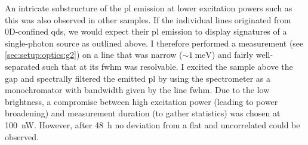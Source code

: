 An intricate substructure of the \gls{pl} emission at lower excitation powers such as this was also observed in other samples.
If the individual lines originated from 0D-confined \glspl{qd}, we would expect their \gls{pl} emission to display signatures of a single-photon source as outlined above. %
I therefore performed a  measurement (see \cref{sec:setup:optics:g2}) on a line that was narrow ($\sim\qty{1}{\milli\electronvolt}$) and fairly well-separated such that at its \gls{fwhm} was resolvable.
I excited the sample above the gap and spectrally filtered the emitted \gls{pl} by using the spectrometer as a monochromator with bandwidth given by the line \gls{fwhm}.
Due to the low brightness, a compromise between high excitation power (leading to power broadening) and measurement duration (to gather statistics) was chosen at \qty{100}{\nano\watt}.
However, after \qty{48}{\hour} no deviation from a flat and uncorrelated  could be observed.

